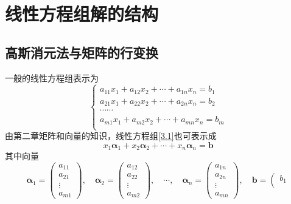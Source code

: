 \section{线性方程组解的结构}
\subsection{高斯消元法与矩阵的行变换}

\begin{definition}
    一般的线性方程组表示为
    \begin{equation}\label{3.1}\tag{3.1}
    \left\{\begin{array}{c}
    a_{11}x_{1}+a_{12}x_{2}+\cdots+a_{1n}x_n=b_1\\
    a_{21}x_{1}+a_{22}x_{2}+\cdots+a_{2n}x_n=b_2\\
    \cdots\cdots\\
    a_{m1}x_{1}+a_{m2}x_{2}+\cdots+a_{mn}x_n=b_m\\
    \end{array}\right.\end{equation}
    由第二章矩阵和向量的知识，线性方程组\eqref{3.1}也可表示成
    \begin{equation}\label{3.2}\tag{3.2}
        x_1\boldsymbol{\alpha}_1+x_2\boldsymbol{\alpha}_2+\cdots+x_n\boldsymbol{\alpha}_n=\boldsymbol{b}
    \end{equation}
    其中向量
    $$\boldsymbol{\alpha}_1=\left(\begin{array}{c}
        a_{11}\\
        a_{21}\\
        \vdots\\
        a_{m1}
    \end{array}\right),\quad
    \boldsymbol{\alpha}_2=\left(\begin{array}{c}
        a_{12}\\
        a_{22}\\
        \vdots\\
        a_{m2}
    \end{array}\right),\quad
    \cdots,\quad
    \boldsymbol{\alpha}_n=\left(\begin{array}{c}
        a_{1n}\\
        a_{2n}\\
        \vdots\\
        a_{mn}
    \end{array}\right),\quad
    \boldsymbol{b}=\left(\begin{array}{c}
        b_{1}\\

\end{array}$$
\end{definition}
